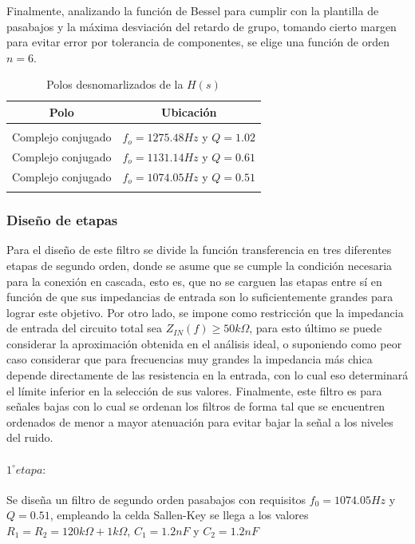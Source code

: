 Finalmente, analizando la funci\'on de Bessel para cumplir con la plantilla de pasabajos y la m\'axima desviaci\'on del retardo de grupo, tomando cierto margen para evitar error por tolerancia de componentes,
se elige una funci\'on de orden $n = 6$.

\begin{table}[H]
    \centering
    \begin{tabular}{c | c}
        Polo & Ubicaci\'on \\
        \hline \\
        Complejo conjugado & $f_o = 1275.48Hz$ y $Q = 1.02$\\
        Complejo conjugado & $f_o = 1131.14Hz$ y $Q = 0.61$\\
        Complejo conjugado & $f_o = 1074.05Hz$ y $Q = 0.51$\\
        \\ \hline
    \end{tabular}
    \caption{Polos desnomarlizados de la $H(s)$}
\end{table}

\subsubsection{Dise\~no de etapas}
Para el dise\~no de este filtro se divide la funci\'on transferencia en tres diferentes etapas de segundo orden, donde se asume que se cumple la condici\'on necesaria para la conexi\'on en cascada,
esto es, que no se carguen las etapas entre s\'i en funci\'on de que sus impedancias de entrada son lo suficientemente grandes para lograr este objetivo. Por otro lado, se impone como restricci\'on que la impedancia de entrada
del circuito total sea $Z_{IN}(f) \geq 50k \Omega$, para esto \'ultimo se puede considerar la aproximaci\'on obtenida en el an\'alisis ideal, o suponiendo como peor caso considerar que para frecuencias muy grandes la impedancia m\'as chica
depende directamente de las resistencia en la entrada, con lo cual eso determinar\'a el l\'imite inferior en la selecci\'on de sus valores. Finalmente, este filtro es para se\~nales bajas con lo cual se ordenan los filtros de forma tal que se encuentren ordenados
de menor a mayor atenuaci\'on para evitar bajar la se\~nal a los niveles del ruido.

\paragraph{$1^{\circ} etapa:$} Se dise\~na un filtro de segundo orden pasabajos con requisitos $f_0 = 1074.05Hz$ y $Q = 0.51$, empleando la celda Sallen-Key se llega a los valores $R_1 = R_2 = 120k \Omega + 1k\Omega$, $C_1 = 1.2nF$ y $C_2 = 1.2nF$

